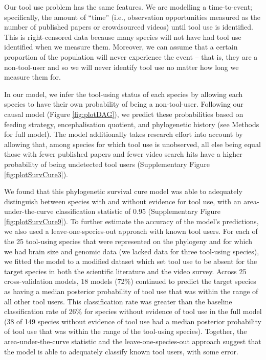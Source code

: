 \documentclass[
  man,floatsintext]{apa6}
\begin{document}
Our tool use problem has the same features. We are modelling a time-to-event;
specifically, the amount of ``time'' (i.e., observation opportunities measured as
the number of published papers or crowdsourced videos) until tool use is
identified. This is right-censored data because many species will not have had
tool use identified when we measure them. Moreover, we can assume that a certain
proportion of the population will never experience the event -- that is, they
are a non-tool-user and so we will never identify tool use no matter how long we
measure them for.

In our model, we infer the tool-using status of each species by allowing each
species to have their own probability of being a non-tool-user. Following our
causal model (Figure \ref{fig:plotDAG}), we predict these probabilities based
on feeding strategy, encephalisation quotient, and phylogenetic history (see
Methods for full model). The model additionally takes research effort into
account by allowing that, among species for which tool use is unobserved, all
else being equal those with fewer published papers and fewer video search hits
have a higher probability of being undetected tool users (Supplementary Figure
\ref{fig:plotSurvCure3}).

We found that this phylogenetic survival cure model was able to adequately
distinguish between species with and without evidence for tool use, with an
area-under-the-curve classification statistic of
0.95 (Supplementary Figure
\ref{fig:plotSurvCure9}). To further estimate the accuracy of the model's
predictions, we also used a leave-one-species-out approach with known tool
users. For each of the 25 tool-using species that were represented on the
phylogeny and for which we had brain size and genomic data (we lacked data for
three tool-using species), we fitted the model to a modified dataset which set
tool use to be absent for the target species in both the scientific literature
and the video survey. Across 25 cross-validation models,
18 models (72\%)
continued to predict the target species as having a median posterior probability
of tool use that was within the range of all other tool users. This
classification rate was greater than the baseline classification rate of
26\%
for species without evidence of tool use in the full model
(38
of 149 species without
evidence of tool use had a median posterior probability of tool use that was
within the range of the tool-using species). Together, the area-under-the-curve
statistic and the leave-one-species-out approach suggest that the model is able
to adequately classify known tool users, with some error.
\end{document}

